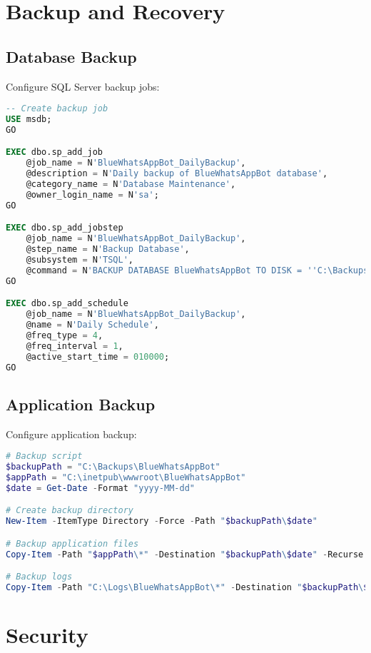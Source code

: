 \section{Backup and Recovery}

\subsection{Database Backup}
Configure SQL Server backup jobs:

\begin{lstlisting}[language=sql]
-- Create backup job
USE msdb;
GO

EXEC dbo.sp_add_job
    @job_name = N'BlueWhatsAppBot_DailyBackup',
    @description = N'Daily backup of BlueWhatsAppBot database',
    @category_name = N'Database Maintenance',
    @owner_login_name = N'sa';
GO

EXEC dbo.sp_add_jobstep
    @job_name = N'BlueWhatsAppBot_DailyBackup',
    @step_name = N'Backup Database',
    @subsystem = N'TSQL',
    @command = N'BACKUP DATABASE BlueWhatsAppBot TO DISK = ''C:\Backups\BlueWhatsAppBot_$(ESCAPE_SQUOTE(DATE)).bak'' WITH INIT';
GO

EXEC dbo.sp_add_schedule
    @job_name = N'BlueWhatsAppBot_DailyBackup',
    @name = N'Daily Schedule',
    @freq_type = 4,
    @freq_interval = 1,
    @active_start_time = 010000;
GO
\end{lstlisting}

\subsection{Application Backup}
Configure application backup:

\begin{lstlisting}[language=powershell]
# Backup script
$backupPath = "C:\Backups\BlueWhatsAppBot"
$appPath = "C:\inetpub\wwwroot\BlueWhatsAppBot"
$date = Get-Date -Format "yyyy-MM-dd"

# Create backup directory
New-Item -ItemType Directory -Force -Path "$backupPath\$date"

# Backup application files
Copy-Item -Path "$appPath\*" -Destination "$backupPath\$date" -Recurse

# Backup logs
Copy-Item -Path "C:\Logs\BlueWhatsAppBot\*" -Destination "$backupPath\$date\Logs" -Recurse
\end{lstlisting}

\section{Security}

